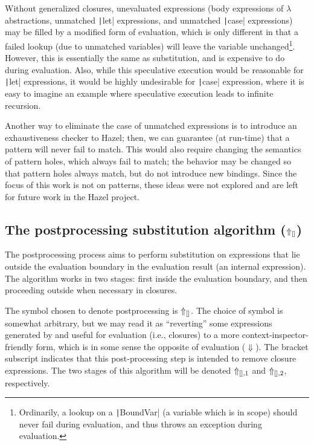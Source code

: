 Without generalized closures, unevaluated expressions (body expressions of $\lambda$ abstractions, unmatched \texttt|let| expressions, and unmatched \texttt|case| expressions) may be filled by a modified form of evaluation, which is only different in that a failed lookup (due to unmatched variables) will leave the variable unchanged\footnote{Ordinarily, a lookup on a \texttt|BoundVar| (a variable which is in scope) should never fail during evaluation, and thus throws an exception during evaluation.}. However, this is essentially the same as substitution, and is expensive to do during evaluation. Also, while this speculative execution would be reasonable for \texttt|let| expressions, it would be highly undesirable for \texttt|case| expression, where it is easy to imagine an example where speculative execution leads to infinite recursion.

Another way to eliminate the case of unmatched expressions is to introduce an exhaustiveness checker to Hazel; then, we can guarantee (at run-time) that a pattern will never fail to match. This would also require changing the semantics of pattern holes, which always fail to match; the behavior may be changed so that pattern holes always match, but do not introduce new bindings. Since the focus of this work is not on patterns, these ideas were not explored and are left for future work in the Hazel project.

\subsection{The postprocessing substitution algorithm ($\Uparrow_{[]}$)}
\label{sec:postprocessing-substitution}

The postprocessing process aims to perform substitution on expressions that lie outside the evaluation boundary in the evaluation result (an internal expression). The algorithm works in two stages: first inside the evaluation boundary, and then proceeding outside when necessary in closures.

The symbol chosen to denote postprocessing is $\Uparrow_{[]}$. The choice of symbol is somewhat arbitrary, but we may read it as ``reverting'' some expressions generated by and useful for evaluation (i.e., closures) to a more context-inspector-friendly form, which is in some sense the opposite of evaluation ($\Downarrow$). The bracket subscript indicates that this post-processing step is intended to remove closure expressions. The two stages of this algorithm will be denoted $\Uparrow_{[],1}$ and $\Uparrow_{[],2}$, respectively.

